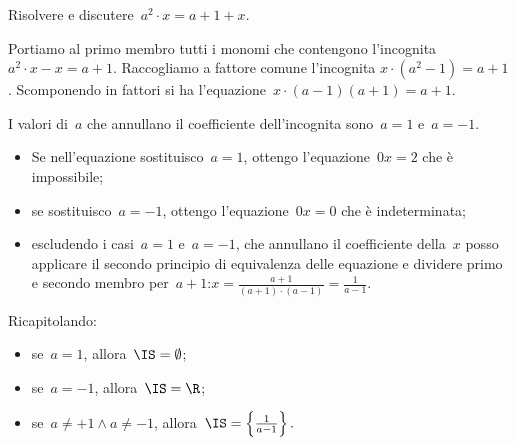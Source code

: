 \begin{esempio}{}{}
Risolvere e discutere~\(a^{2}\cdot x=a+1+x\).

Portiamo al primo membro tutti i monomi che contengono 
l'incognita~\(a^{2}\cdot x-x=a+1\).
Raccogliamo a fattore comune l'incognita 
\(x\cdot \left(a^{2}-1\right)=a+1\).
Scomponendo in fattori si ha 
l'equazione~\(x\cdot \left(a-1\right)\left(a+1\right)=a+1\).

I valori di~\(a\) che annullano il coefficiente dell'incognita 
sono~\(a=1\) e~\(a=-1\).
\begin{itemize}[nosep]
\item Se nell'equazione sostituisco~\(a=1\), ottengo 
l'equazione~\(0x=2\) che è impossibile;
\item se sostituisco~\(a=-1\), ottengo l'equazione~\(0x=0\) che è 
indeterminata;
\item escludendo i casi~\(a=1\) e~\(a=-1\), che annullano il 
coefficiente della~\(x\) posso applicare il secondo principio
di equivalenza delle equazione e dividere primo e secondo membro 
per~\(a+1\):\quad \(x=\frac{a+1}{\left(a+1\right)\cdot
\left(a-1\right)}=\frac{1}{a-1}\).
\end{itemize}
Ricapitolando:
\begin{itemize}[nosep]
\item se~\(a=1\), allora~\(\IS=\emptyset\);
\item se~\(a=-1\), allora~\(\IS=\R\);
\item se~\(a\neq +1\wedge a\neq -1\),
    allora~\(\IS=\left\{\frac{1}{a-1}\right\}.\)
\end{itemize}
\end{esempio}

